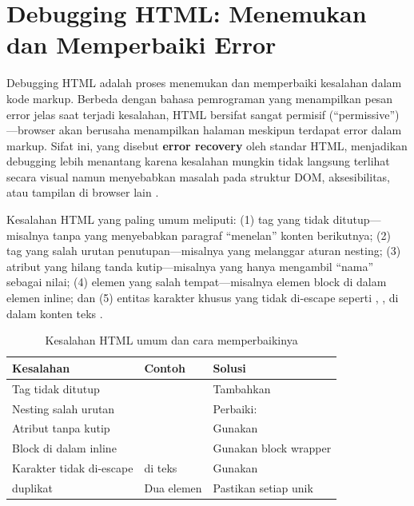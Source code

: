 ﻿\section{Debugging HTML: Menemukan dan Memperbaiki Error}

Debugging HTML adalah proses menemukan dan memperbaiki kesalahan dalam kode markup. Berbeda dengan bahasa pemrograman yang menampilkan pesan error jelas saat terjadi kesalahan, HTML bersifat sangat permisif (``permissive'')---browser akan berusaha menampilkan halaman meskipun terdapat error dalam markup. Sifat ini, yang disebut \textbf{error recovery} oleh standar HTML, menjadikan debugging lebih menantang karena kesalahan mungkin tidak langsung terlihat secara visual namun menyebabkan masalah pada struktur DOM, aksesibilitas, atau tampilan di browser lain \cite{mdnHtmlIntro}.

Kesalahan HTML yang paling umum meliputi: (1) tag yang tidak ditutup---misalnya  tanpa  yang menyebabkan paragraf ``menelan'' konten berikutnya; (2) tag yang salah urutan penutupan---misalnya  yang melanggar aturan nesting; (3) atribut yang hilang tanda kutip---misalnya  yang hanya mengambil ``nama'' sebagai nilai; (4) elemen yang salah tempat---misalnya elemen block di dalam elemen inline; dan (5) entitas karakter khusus yang tidak di-escape seperti \code{<}, \code{>}, \code{\&} di dalam konten teks \cite{whatwgHtml}.

\begin{table}[H]
\centering
\begin{tabular}{|P{3.5cm}|P{4cm}|P{4.5cm}|}
\hline
\textbf{Kesalahan} & \textbf{Contoh} & \textbf{Solusi} \\
\hline
Tag tidak ditutup &  & Tambahkan  \\
\hline
Nesting salah urutan &  & Perbaiki:  \\
\hline
Atribut tanpa kutip &  & Gunakan  \\
\hline
Block di dalam inline &  & Gunakan block wrapper \\
\hline
Karakter tidak di-escape &  di teks & Gunakan  \\
\hline
{} duplikat & Dua elemen  & Pastikan setiap  unik \\
\hline
\end{tabular}
\caption{Kesalahan HTML umum dan cara memperbaikinya}
\end{table}


